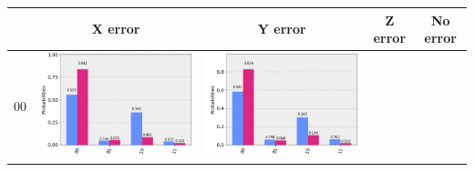 \documentclass[11pt]{article}
\begin{document}
\begin{table}[h!]
    \centering
    \begin{tabular}{| c | c | c | c | c | }
      \hline
      & X error & Y error & Z error & No error \\ 
      \hline
      00 & 
      \begin{minipage}{.215\textwidth}
        \includegraphics[width=\linewidth]{img/qecc3_X00.png}
      \end{minipage}&
      \begin{minipage}{.215\textwidth}
        \includegraphics[width=\linewidth]{img/qecc3_Y00.png}
      \end{minipage}
      &\begin{minipage}{.215\textwidth}

\end{minipage}
\end{tabular}
\end{table}
\end{document}
